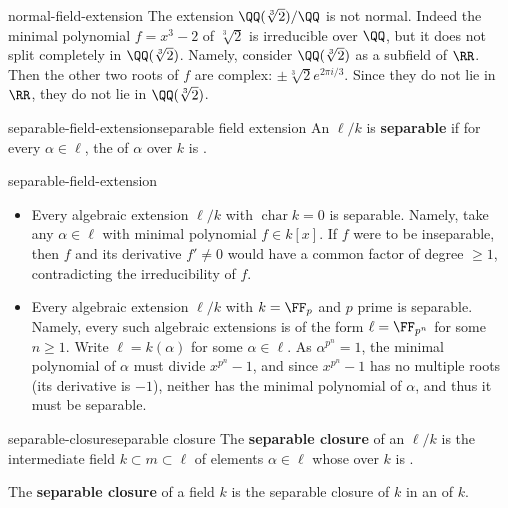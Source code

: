 \begin{example}{normal-field-extension}
    The extension $\QQ(\sqrt[3]{2}) / \QQ$ is not normal. Indeed the minimal polynomial $f = x^3 - 2$ of $\sqrt[3]{2}$ is irreducible over $\QQ$, but it does not split completely in $\QQ(\sqrt[3]{2})$. Namely, consider $\QQ(\sqrt[3]{2})$ as a subfield of $\RR$. Then the other two roots of $f$ are complex: $\pm \sqrt[3]{2} e^{2 \pi i / 3}$. Since they do not lie in $\RR$, they do not lie in $\QQ(\sqrt[3]{2})$.
\end{example}

\begin{topic}{separable-field-extension}{separable field extension}
    An   $\ell/k$ is \textbf{separable} if for every $\alpha \in \ell$, the  of $\alpha$ over $k$ is .
\end{topic}

\begin{example}{separable-field-extension}
\begin{itemize}
    \item Every algebraic extension $\ell/k$ with $\operatorname{char} k = 0$ is separable. Namely, take any $\alpha \in \ell$ with minimal polynomial $f \in k[x]$. If $f$ were to be inseparable, then $f$ and its derivative $f' \ne 0$ would have a common factor of degree $\ge 1$, contradicting the irreducibility of $f$. 
    \item Every algebraic extension $\ell/k$ with $k = \FF_p$ and $p$ prime is separable. Namely, every such algebraic extensions is of the form $\ell = \FF_{p^n}$ for some $n \ge 1$. Write $\ell = k(\alpha)$ for some $\alpha \in \ell$. As $\alpha^{p^n} = 1$, the minimal polynomial of $\alpha$ must divide $x^{p^n} - 1$, and since $x^{p^n} - 1$ has no multiple roots (its derivative is $-1$), neither has the minimal polynomial of $\alpha$, and thus it must be separable.
\end{itemize}
\end{example}

\begin{topic}{separable-closure}{separable closure}
    The \textbf{separable closure} of an  $\ell/k$ is the intermediate field $k \subset m \subset \ell$ of elements $\alpha \in \ell$ whose  over $k$ is .
    
    The \textbf{separable closure} of a field $k$ is the separable closure of $k$ in an  of $k$.
\end{topic}

